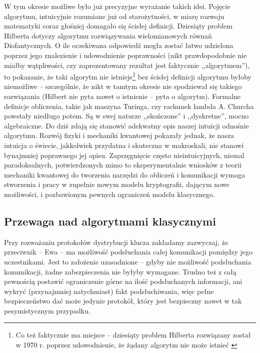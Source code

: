 \documentclass[10pt]{article}
\begin{document}
W tym okresie możliwe było już precyzyjne wyrażanie
takich idei. Pojęcie algorytmu, intuicyjnie rozumiane już od starożytności, w miarę rozwoju 
matematyki coraz głośniej domagało się ścisłej definicji. Dziesiąty problem Hilberta \cite{Gray01}
dotyczy algorytmu rozwiązywania wielomianowych równań Diofantycznych. O ile oczekiwana odpowiedź 
mogła zostać łatwo udzielona poprzez jego znalezienie i udowodnienie poprawności (nikt prawdopodobnie
nie miałby wątpliwości, czy zaprezentowany rezultat jest faktycznie ,,algorytmem''), to pokazanie,
że taki algorytm nie istnieje\footnote{Co też faktycznie ma miejsce -- dziesiąty problem Hilberta
rozwiązany został w 1970 r. poprzez udowodnienie, że żądany algorytm nie może istnieć 
\cite{Matiyasevich70}} bez ścisłej definicji algorytmu byłoby niemożliwe -- szczególnie,
że nikt w tamtym okresie nie spodziewał się takiego rozwiązania (Hilbert nie pyta nawet o istnienie
-- pyta o algorytm\footnotemark).
Formalne definicje obliczenia, takie jak maszyna Turinga, czy rachunek lambda A. Churcha powstały 
niedługo potem. Są w swej naturze ,,skończone'' i ,,dyskretne'', mocno algebraiczne. Do dziś zdają
się stanowić adekwatny opis naszej intuicji odnośnie algorytmu. Rozwój fizyki i mechaniki kwantowej
pokazały jednak, że nasza intuicja o świecie, jakkolwiek przydatna i skuteczna w makroskali, nie
stanowi bynajmniej poprawnego jej opisu. Zaprzęgnięcie często nieintuicyjnych, niemal paradoksalnych,
potwierdzonych mimo to eksperymentalnie wniosków z teorii mechaniki kwantowej do tworzenia narzędzi
do obliczeń i komunikacji wymaga stworzenia i pracy w zupełnie nowym modelu kryptografii, dającym
nowe możliwości, i pozbawionym pewnych ograniczeń modelu klasycznego.
 
\subsection{Przewaga nad algorytmami klasycznymi}

Przy rozważaniu protokołów dystrybucji klucza zakładamy zazwyczaj, że przeciwnik -- Ewa -- ma możliwość
podsłuchania całej komunikacji pomiędzy jego uczestnikami. Jest to założenie uzasadnione -- gdyby nie
możliwość podsłuchania komunikacji, żadne zabezpieczenia nie byłyby wymagane. Trudno też z całą 
pewnością postawić ograniczenie górne na ilość podsłuchanych informacji, ani wykryć (przynajmniej
natychmiast) fakt podsłuchiwania, więc pełne bezpieczeństwo dać może jedynie protokół, który jest 
bezpieczny nawet w tak pesymistycznym przypadku. 
\end{document}
